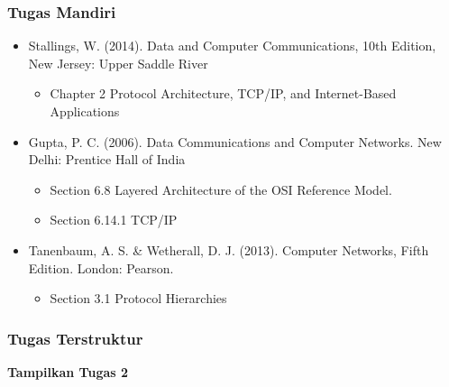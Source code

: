 \documentclass[pdflatex,compress]{beamer}
\begin{document}
\begin{frame}
	\frametitle{Tugas Mandiri}
	\begin{itemize}
		\item Stallings, W. (2014). Data and Computer Communications, 10th Edition, New Jersey: Upper Saddle River\\
		\begin{itemize}
			\item Chapter 2 Protocol Architecture, TCP/IP, and Internet-Based Applications
		\end{itemize}
		\item Gupta, P. C. (2006). Data Communications and Computer Networks. New Delhi: Prentice Hall of India\\
		\begin{itemize}
			\item Section 6.8 Layered Architecture of the OSI Reference Model.
			\item Section 6.14.1 TCP/IP
		\end{itemize}
		\item Tanenbaum, A. S. \& Wetherall, D. J. (2013). Computer Networks, Fifth Edition. London: Pearson.\\
		\begin{itemize}
			\item Section 3.1 Protocol Hierarchies
		\end{itemize}
	\end{itemize}
\end{frame}

\begin{frame}
	\frametitle{Tugas Terstruktur}
	\textbf{Tampilkan Tugas 2}
\end{frame}
\end{document}
